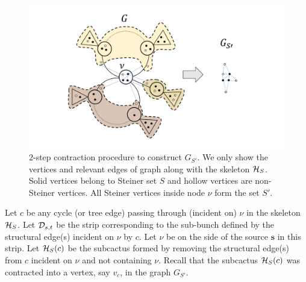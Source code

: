 \begin{figure}
    \centering
    \includegraphics[width=\textwidth]{src/images/image_contraction.pdf}{}
    \caption{$2$-step contraction procedure to construct $G_{S'}$. We only show the vertices and relevant edges of graph along with the skeleton ${\cal H}_S$. Solid vertices belong to Steiner set $S$ and hollow vertices are non-Steiner vertices. All Steiner vertices inside node $\nu$ form the set $S'$.}
    \label{fig:image-contraction}
\end{figure}


Let $c$ be any cycle (or tree edge) passing through (incident on) $\nu$ in the skeleton
${\cal H}_S$. Let ${\cal D}_{s,t}$ be the strip corresponding to the sub-bunch defined by the structural edge(s) incident on $\nu$ by $c$.
Let $\nu$ be on the side of the source $\mathbf{s}$ in this strip.
Let ${\cal H}_S(c)$ be the subcactus formed by removing the structural edge(s) from $c$ incident on $\nu$ and not containing $\nu$. 
Recall that the subcactus ${\cal H}_S(c)$ was contracted into a vertex, say $v_c$, in the graph 
$G_{S'}$.

